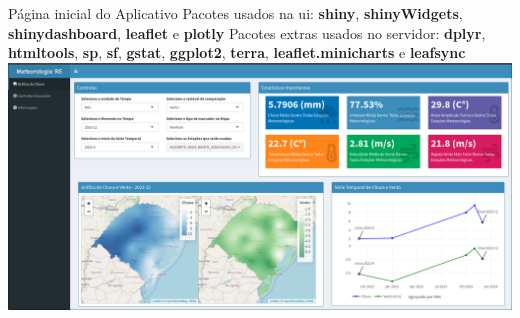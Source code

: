 \documentclass[aspectratio=1610]{beamer}
\begin{document}
\begin{frame}{Página inicial do Aplicativo}
    Pacotes usados na ui: \textbf{shiny}, \textbf{shinyWidgets}, \textbf{shinydashboard}, \textbf{leaflet} e \textbf{plotly}
    Pacotes extras usados no servidor: \textbf{dplyr}, \textbf{htmltools}, \textbf{sp}, \textbf{sf}, \textbf{gstat}, \textbf{ggplot2}, \textbf{terra}, \textbf{leaflet.minicharts} e \textbf{leafsync}
    \includegraphics[width = \textwidth]{pagina_inicial.png}
\end{frame}
\end{document}
